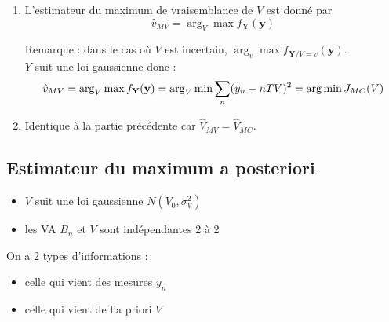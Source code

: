 \documentclass[main.tex]{subfiles}
\begin{document}
\begin{enumerate}\setlength{\itemsep}{10mm}
\item L'estimateur du maximum de vraisemblance de $V$ est donné par 
\[ \hat{v}_{MV} = \arg_V \max f_{\textbf{Y}}(\mathbf{y}) \]

Remarque : dans le cas où $V$ est incertain, $\arg_v \max f_{\mathbf{Y}/V=v}(\mathbf{y})$.\\

$Y$ suit une loi gaussienne donc :
\[ \hat{v}_{MV} = \arg_V \max f_{\textbf{Y}}(\mathbf{y}) = \arg_V \min \sum_n (y_n-nTV)^2 = \arg \min J_{MC}(V)\]

\item Identique à la partie précédente car $\hat{V}_{MV} = \hat{V}_{MC}$.
\end{enumerate}

\subsection{Estimateur du maximum a posteriori}
\begin{itemize}
\item $V$ suit une loi gaussienne $N(V_0,\sigma_V^2)$
\item les VA $B_n$ et $V$ sont indépendantes 2 à 2
\end{itemize}
\medskip
On a 2 types d'informations :
\begin{itemize}
\item celle qui vient des mesures $y_n$
\item celle qui vient de l'a priori $V$
\end{itemize}
\end{document}
